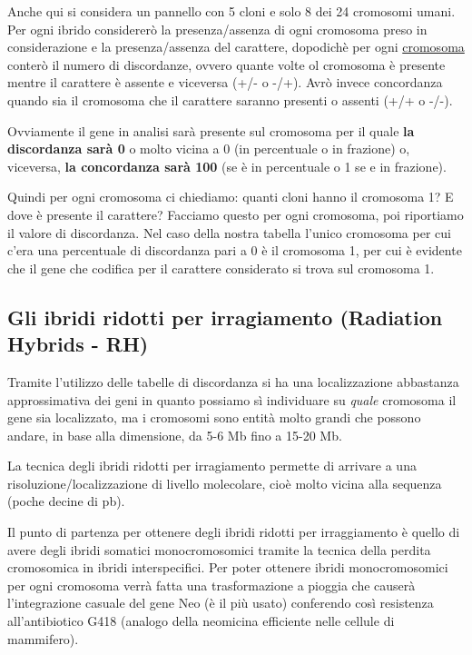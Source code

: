 \documentclass[11pt]{book}
\begin{document}
Anche qui si considera un pannello con 5 cloni e solo 8 dei 24 cromosomi umani.\\
Per ogni ibrido considererò la presenza/assenza di ogni cromosoma preso in considerazione e la presenza/assenza del carattere, dopodichè per ogni \underline{cromosoma} conterò il numero di discordanze, ovvero quante volte ol cromosoma è presente mentre il carattere è assente e viceversa (+/- o -/+). Avrò invece concordanza quando sia il cromosoma che il carattere saranno presenti o assenti (+/+ o -/-).

Ovviamente il gene in analisi sarà presente sul cromosoma per il quale \textbf{la discordanza sarà 0} o molto vicina a 0 (in percentuale o in frazione) o, viceversa, \textbf{la concordanza sarà 100} (se è in percentuale o 1 se e in frazione).

\clearpage
Quindi per ogni cromosoma ci chiediamo: quanti cloni hanno il cromosoma 1? E dove è presente il carattere?
Facciamo questo per ogni cromosoma, poi riportiamo il valore di discordanza. Nel caso della nostra tabella l’unico cromosoma per cui c’era una percentuale di discordanza pari a 0 è il cromosoma 1, per cui è evidente che il gene che codifica per il carattere considerato si trova sul cromosoma 1.


\subsection{Gli ibridi ridotti per irragiamento (Radiation Hybrids - RH)}

Tramite l'utilizzo delle tabelle di discordanza si ha una localizzazione abbastanza approssimativa dei geni in quanto possiamo sì individuare su \emph{quale} cromosoma il gene sia localizzato, ma i cromosomi sono entità molto grandi che possono andare, in base alla dimensione, da 5-6 Mb fino a 15-20 Mb.

La tecnica degli ibridi ridotti per irragiamento permette di arrivare a una risoluzione/localizzazione di livello molecolare, cioè molto vicina alla sequenza (poche decine di pb).

Il punto di partenza per ottenere degli ibridi ridotti per irraggiamento è quello di avere degli ibridi somatici monocromosomici tramite la tecnica della perdita cromosomica in ibridi interspecifici. 
Per poter ottenere ibridi monocromosomici per ogni cromosoma verrà fatta una trasformazione a pioggia che causerà l'integrazione casuale del gene Neo (è il più usato) conferendo così resistenza all'antibiotico G418 (analogo della neomicina efficiente nelle cellule di mammifero).
\end{document}
